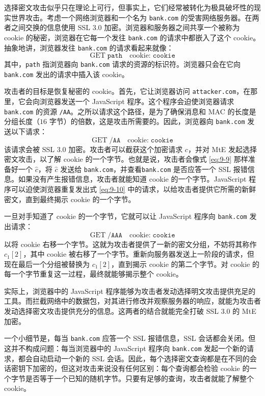 \begin{snote}
选择密文攻击似乎只在理论上可行，但事实上，它们经常被转化为极具破坏性的现实世界攻击。考虑一个网络浏览器和一个名为 \texttt{bank.com} 的受害网络服务器。在两者之间交换的信息使用 SSL 3.0 加密。浏览器和服务器之间共享一个被称为 cookie 的秘密，浏览器在它每一个发往 \texttt{bank.com} 的请求中都嵌入了这个 cookie。抽象地讲，浏览器发往 \texttt{bank.com} 的请求看起来就像：
\[
\boxed{\;\text{GET}\;\texttt{path}\quad\text{cookie:}\;\texttt{cookie}\;}
\]
其中，\texttt{path} 指浏览器向 \texttt{bank.com} 请求的资源的标识符。浏览器只会在它向 \texttt{bank.com} 发出的请求中插入该 cookie。

攻击者的目标是恢复秘密的 cookie。首先，它让浏览器访问 \texttt{attacker.com}，在那里，它会向浏览器发送一个 JavaScript 程序。这个程序会迫使浏览器请求 \texttt{bank.com} 的资源 \texttt{/AA}。之所以请求这个路径，是为了确保消息和 MAC 的长度是分组长度（$16$ 字节）的倍数，这是攻击所需要的。因此，浏览器向 \texttt{bank.com} 发送以下请求：
\begin{equation}\label{eq:9-10}
\boxed{\;\text{GET}\;\texttt{/AA}\quad\text{cookie:}\;\texttt{cookie}\;}
\end{equation}
该请求会被 SSL 3.0 加密。攻击者可以截获这个加密请求 $c$，并对 MtE 发起选择密文攻击，以了解 cookie 的一个字节。也就是说，攻击者会像式 \ref{eq:9-9} 那样准备好一个 $\hat{c}$，将 $\hat{c}$ 发送给 \texttt{bank.com}，并查看\texttt{bank.com} 是否应答一个 SSL 报错信息。如果没有产生报错信息，攻击者就能知道 cookie 的一个字节。JavaScript 程序可以迫使浏览器重复发出式 \ref{eq:9-10} 中的请求，以给攻击者提供它所需的新鲜密文，直到最终揭示 cookie 的一个字节。

一旦对手知道了 cookie 的一个字节，它就可以让 JavaScript 程序向 \texttt{bank.com} 发出请求：
\[
\boxed{\;\text{GET}\;\texttt{/AAA}\quad\text{cookie:}\;\texttt{cookie}\;}
\]
以将 cookie 右移一个字节。这就为攻击者提供了一新的密文分组，不妨将其称作 $c_1[2]$，其中 cookie 被右移了一个字节。重新向服务器发送上一阶段的请求，但现在最后一个分组被替换为 $c_1[2]$，直到揭示 cookie 的第二个字节。对 cookie 的每一个字节重复这一过程，最终就能够揭示整个 cookie。

实际上，浏览器中的 JavaScript 程序能够为攻击者发动选择明文攻击提供充足的工具。而拦截网络中的数据包，对其进行修改并观察服务器的响应，就能为攻击者发动选择密文攻击提供充分的信息。这两者的结合就能完全打破 SSL 3.0 的 MtE 加密。

一个小细节是，每当 \texttt{bank.com} 应答一个 SSL 报错信息，SSL 会话都会关闭。但这并不构成问题：每当浏览器中的 JavaScript 程序向 \texttt{bank.com} 发起一个新的请求，都会自动启动一个新的 SSL 会话。因此，每个选择密文查询都是在不同的会话密钥下加密的，但这对攻击来说没有任何区别：每个查询都会检验 cookie 的一个字节是否等于一个已知的随机字节。只要有足够的查询，攻击者就能了解整个 cookie。
\end{snote}

